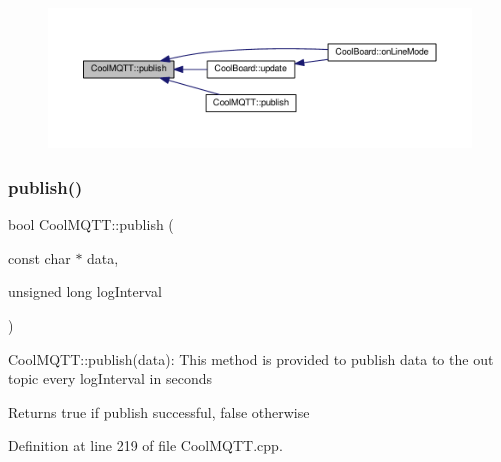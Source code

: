 \begin{figure}[H]
\begin{center}
\leavevmode
\includegraphics[width=350pt]{d0/dd0/class_cool_m_q_t_t_ace977b3e90ab14b1199fe5c4fb0a13ec_icgraph}
\end{center}
\end{figure}
\mbox{\label{class_cool_m_q_t_t_a613c5e3927ae85bb94fbf648d84d8780}} 
\subsubsection{\texorpdfstring{publish()}{publish()}\hspace{0.1cm}{\footnotesize\ttfamily [2/2]}}
{\footnotesize\ttfamily bool Cool\+M\+Q\+T\+T\+::publish (\begin{DoxyParamCaption}\item[{const char $\ast$}]{data,  }\item[{unsigned long}]{log\+Interval }\end{DoxyParamCaption})}

Cool\+M\+Q\+T\+T\+::publish(data)\+: This method is provided to publish data to the out topic every log\+Interval in seconds

\begin{DoxyReturn}{Returns}
true if publish successful, false otherwise 
\end{DoxyReturn}


Definition at line 219 of file Cool\+M\+Q\+T\+T.\+cpp.


